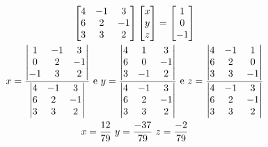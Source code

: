 \documentclass{beamer}
\begin{document}
\begin{frame}
  \begin{gather*}
    \begin{bmatrix}
      4 & -1 & 3 \\
      6 & 2 & -1 \\
      3 & 3 & 2
    \end{bmatrix}\begin{bmatrix}
      x \\ y \\ z
    \end{bmatrix} = \begin{bmatrix}
      1 \\ 0 \\ -1
    \end{bmatrix} \\
    x = { \begin{vmatrix}
      1 & -1 & 3 \\
      0 & 2 & -1 \\
      -1 & 3 &2
     \end{vmatrix} \over \begin{vmatrix}
       4 & -1 & 3 \\
       6 & 2 & -1 \\
       3 & 3 & 2
     \end{vmatrix}} \text{ e }
    y = { \begin{vmatrix}
     4& 1 &  3 \\
     6 & 0 &  -1 \\
      3&-1 & 2
     \end{vmatrix} \over \begin{vmatrix}
       4 & -1 & 3 \\
       6 & 2 & -1 \\
       3 & 3 & 2
     \end{vmatrix}} \text{ e }
     z = { \begin{vmatrix}
      4 & -1 & 1 \\
      6 & 2 & 0 \\
      3 & 3 &-1
     \end{vmatrix} \over \begin{vmatrix}
       4 & -1 & 3 \\
       6 & 2 & -1 \\
       3 & 3 & 2
     \end{vmatrix}} \\
     x=\frac{12}{79}\text{ }y=\frac{-37}{79}\text{ }z=\frac{-2}{79}
\end{gather*}
\end{frame}
\end{document}
